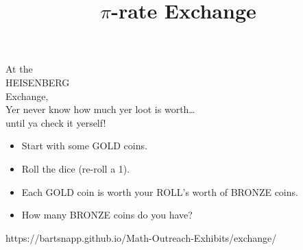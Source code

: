 \documentclass{../exhibit}
\title{$\pi$-rate Exchange}
\begin{document}
\begin{context}
  At the \\[1cm]
  \phantom{At the}HEISENBERG \\[1cm]
  \phantom{bjksjfdfshhjdfsdfkj} Exchange,\\[1cm]
  Yer never know how much yer loot is worth\dots \\[1cm]
  \phantom{ldkjfkdsfl}until ya check it yerself!
\end{context}

\begin{directions}
  \begin{itemize}
  \item Start with some GOLD coins.
  \item Roll the dice (re-roll a 1).
  \item Each GOLD coin is worth your ROLL's worth of BRONZE coins.
  \item How many BRONZE coins do you have?
  \end{itemize}
\end{directions}


\begin{example}

\end{example}


\begin{mathConnections}
  https://bartsnapp.github.io/Math-Outreach-Exhibits/exchange/
\end{mathConnections}
\end{document}
